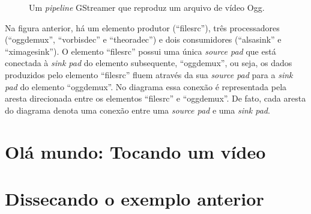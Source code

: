 \documentclass{SBCbookchapter}
\def\en#1{\foreignlanguage{english}{\emph{#1}}}
\begin{document}
\begin{figure}[H]
  \centering
  \caption{Um \en{pipeline} GStreamer que reproduz um arquivo de vídeo Ogg.}
  \label{fig:pipeline-tipico}
\end{figure}

Na figura anterior, há um elemento produtor (``filesrc''), três
processadores (``oggdemux'', ``vorbisdec'' e ``theoradec'') e dois
consumidores (``alsasink'' e ``ximagesink'').  O elemento ``filesrc'' possui
uma única \en{source pad} que está conectada à \en{sink pad} do elemento
subsequente, ``oggdemux'', ou seja, os dados produzidos pelo elemento
``filesrc'' fluem através da sua \en{source pad} para a \en{sink pad} do
elemento ``oggdemux''.  No diagrama essa conexão é representada pela aresta
direcionada entre os elementos ``filesrc'' e ``oggdemux''.  De fato, cada
aresta do diagrama denota uma conexão entre uma \en{source pad} e uma
\en{sink pad}.




\section{Olá mundo: Tocando um vídeo}
\label{sec:ola}


\section{Dissecando o exemplo anterior}
\label{sec:dissec}
\end{document}

